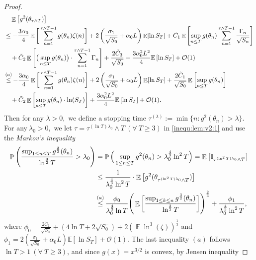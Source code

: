 \documentclass[standalone]{article}
\newcommand{\E}{\mathbb{E}}
\newcommand{\I}{\mathbb{I}}
\DeclareMathOperator{\Expect}{\mathbb{E}}
\DeclareMathOperator{\Pro}{\mathbb{P}}
\begin{document}
\begin{proof}
\begin{align}
&\quad\Expect\big[{g^{2}(\theta_{\tau\wedge T})}\big] \notag \\ 
&\le- \frac{3\alpha_{0}}{4}\Expect\bigg[\sum_{n=1}^{\tau\wedge T-1} g(\theta_{n}) \zeta(n)\bigg]+
2\left(\frac{\sigma_1}{\sqrt{S_0}} + \alpha_0 L\right)\Expect[\ln S_{T}]+\tilde{C}_1\Expect\left[\sup_{n\le T}g(\theta_{n})  \sum_{n=1}^{\tau\wedge T-1}\frac{\Gamma_n}{\sqrt{S_n}}\right]\notag \\
& \quad +\tilde{C}_2\Expect\left[\big(\sup_{n\le T}g(\theta_{n})\big) \cdot \sum_{n=1}^{\tau\wedge T-1}\Gamma_n\right] + \frac{2\tilde{C}_3}{\sqrt{S_0}} +\frac{3\alpha_{0}^2 L^2}{4}\E\left[\ln S_{T}\right] + \mathcal{O}(1)
\notag \\
&\mathop{\le}^{(a)} - \frac{3\alpha_{0}}{4}\Expect\bigg[\sum_{n=1}^{\tau\wedge T-1} g(\theta_{n}) \zeta(n)\bigg]+
2\left(\frac{\sigma_1}{\sqrt{S_0}} + \alpha_0 L\right)\Expect[\ln S_{T}]+\frac{2\tilde{C}_1}{\sqrt{S_0}}\Expect\left[\sup_{n\le T}g(\theta_{n})\right] \notag \\
&\quad +\tilde{C}_2\Expect\left[\sup_{n\le T}g(\theta_{n}) \cdot \ln(S_T)\right] + \frac{3\alpha_{0}^2 L^2}{4}\E\left[\ln S_{T}\right]+ \mathcal{O}(1).
\end{align}  
Then for any $\lambda>0,$ we define a stopping time $\tau^{(\lambda)}:=\min\Big\{n:{g^{2}(\theta_{n})}>\lambda\Big\}.$ For any$\ \lambda_{0}>0,$ we let $\tau = \tau^{(\ln T)\lambda_{0}}\wedge T\ (\forall\ T\ge 3)$ in  \cref{inequ:lem:v2:1} and use the \emph{ Markov's inequality}
\begin{align}\label{jrnjrn_1}
\Pro\Bigg(\frac{\sup_{1\le n\le T}{g^{\frac{3}{2}}(\theta_{n})}}{\ln^{\frac{3}{2}} T}>\lambda_{0}\Bigg)&=\Pro\Big(\sup_{1\le n\le T}{g^{2}(\theta_{n})}>\lambda^{\frac{4}{3}}_{0}\ln^{2} T\Big)=\Expect\left[\I_{\tau^{(\ln^{2}T)\lambda_{0}}\wedge T}\right]\notag \\
&\le \frac{1}{\lambda^{\frac{4}{3}}_{0}\ln^{2} T}\cdot\Expect\left[{g^{2}(\theta_{\tau^{(\ln^{2} T)\lambda_{0}}\wedge T})}\right] \notag \\
&\mathop{\le}^{(a)}\frac{\phi_{0}}{\lambda^{\frac{4}{3}}_{0} \ln T}\Bigg(\Expect\bigg[\frac{\sup_{1\le k\le n}{g^{\frac{3}{2}}(\theta_{n})}}{\ln^{\frac{3}{2}} T}\bigg]\Bigg)^{\frac{2}{3}}+\frac{\phi_{1}}{\lambda_{0}^{\frac{4}{3}}\ln^2 T},\end{align}
where $\phi_0 =\frac{2\tilde{C}_1}{\sqrt{S_0}} + \left(4\ln T + 2\sqrt{S_0} \right) + 2 \left(\Expect\ln^{3}(\zeta)\right)^{\frac{1}{3}}$ and $\phi_1 = 2\left(\frac{\sigma_1}{\sqrt{S_0}} + \alpha_0 L\right)\E\left[\ln S_{T}\right] + \mathcal{O}(1)$. The last inequality $(a)$ follows $\ln T>1\ (\forall\ T\ge 3)$, and since $g(x) = x^{3/2}$ is convex, by Jensen inequality 

\end{proof}
\end{document}
